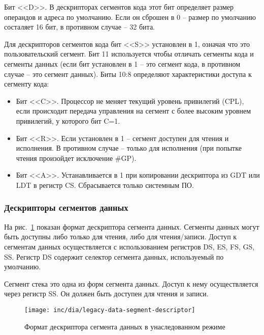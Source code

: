 Бит <<D>>. В дескрипторах сегментов кода этот бит определяет размер операндов и адреса по умолчанию.
Если он сброшен в 0 -- размер по умолчанию состаляет 16 бит, в противном случае -- 32 бита.

Для дескрипторов сегментов кода бит <<S>> установлен в 1, означая что это пользовательский сегмент. Бит 11
используется чтобы отличать сегменты кода и сегменты данных (если бит установлен в 1 -- это сегмент кода,
в противном случае -- это сегмент данных). Биты 10:8 определяют характеристики доступа к сегменту кода:
\begin{itemize}
	\item Бит <<C>>. Процессор не меняет текущий уровень привилегий (CPL), если происходит передача управления
		на сегмент с более высоким уровнем привилегий, у которого бит C=1.
	\item Бит <<R>>. Если установлен в 1 -- сегмент доступен для чтения и исполнения. В противном случае --
		только для исполнения (при попытке чтения произойдет исключение \#GP).
	\item Бит <<A>>. Устанавливается в 1 при копировании дескриптора из GDT или LDT в регистр CS. Сбрасывается
		только системным ПО.
\end{itemize}

\subsubsection*{Дескрипторы сегментов данных}
На рис.~\ref{fig:legacy-data-segment-descriptor-format} показан формат дескриптора сегмента данных.
Сегменты данных могут быть доступны либо только для чтения, либо для чтения/записи. Доступ к сегментам
данных осуществляется с использованием регистров DS, ES, FS, GS, SS. Регистр DS содержит селектор
сегмента данных, используемый по умолчанию.

Сегмент стека это одна из форм сегмента данных. Доступ к нему осуществляется через регистр SS. Он должен
быть доступен для чтения и записи.

\begin{figure}[ht!]
  \centering
  \texttt{[image: inc/dia/legacy-data-segment-descriptor]}
  \caption{Формат дескриптора сегмента данных в унаследованном режиме}
  \label{fig:legacy-data-segment-descriptor-format}
\end{figure}

